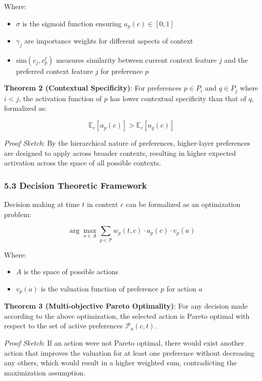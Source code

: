 \documentclass[
]{article}
\providecommand{\tightlist}{%
  \setlength{\itemsep}{0pt}\setlength{\parskip}{0pt}}
\begin{document}
Where:

\begin{itemize}
\tightlist
\item
  \(\sigma\) is the sigmoid function ensuring \(a_p(c) \in [0,1]\)
\item
  \(\gamma_j\) are importance weights for different aspects of context
\item
  \(\text{sim}(c_j, c_p^j)\) measures similarity between current context
  feature \(j\) and the preferred context feature \(j\) for preference
  \(p\)
\end{itemize}

\textbf{Theorem 2 (Contextual Specificity)}: For preferences
\(p \in P_i\) and \(q \in P_j\) where \(i < j\), the activation function
of \(p\) has lower contextual specificity than that of \(q\), formalized
as:

\[\mathbb{E}_c[a_p(c)] > \mathbb{E}_c[a_q(c)]\]

\emph{Proof Sketch}: By the hierarchical nature of preferences,
higher-layer preferences are designed to apply across broader contexts,
resulting in higher expected activation across the space of all possible
contexts.

\subsubsection{5.3 Decision Theoretic
Framework}\label{decision-theoretic-framework}

Decision making at time \(t\) in context \(c\) can be formalized as an
optimization problem:

\[\arg\max_{a \in A} \sum_{p \in \mathcal{P}} w_p(t, c) \cdot a_p(c) \cdot v_p(a)\]

Where:

\begin{itemize}
\tightlist
\item
  \(A\) is the space of possible actions
\item
  \(v_p(a)\) is the valuation function of preference \(p\) for action
  \(a\)
\end{itemize}

\textbf{Theorem 3 (Multi-objective Pareto Optimality)}: For any decision
made according to the above optimization, the selected action is Pareto
optimal with respect to the set of active preferences
\(\mathcal{P}_a(c,t)\).

\emph{Proof Sketch}: If an action were not Pareto optimal, there would
exist another action that improves the valuation for at least one
preference without decreasing any others, which would result in a higher
weighted sum, contradicting the maximization assumption.
\end{document}
